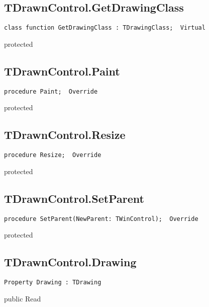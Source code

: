 \subsection{TDrawnControl.GetDrawingClass}
\label{hmi:drawncontrol:tdrawncontrol:getdrawingclass}
\begin{FPCList}
\Declaration 

\begin{verbatim}
class function GetDrawingClass : TDrawingClass;  Virtual
\end{verbatim}
\Visibility
protected
\end{FPCList}
\subsection{TDrawnControl.Paint}
\label{hmi:drawncontrol:tdrawncontrol:paint}
\begin{FPCList}
\Declaration 

\begin{verbatim}
procedure Paint;  Override
\end{verbatim}
\Visibility
protected
\end{FPCList}
\subsection{TDrawnControl.Resize}
\label{hmi:drawncontrol:tdrawncontrol:resize}
\begin{FPCList}
\Declaration 

\begin{verbatim}
procedure Resize;  Override
\end{verbatim}
\Visibility
protected
\end{FPCList}
\subsection{TDrawnControl.SetParent}
\label{hmi:drawncontrol:tdrawncontrol:setparent}
\begin{FPCList}
\Declaration 

\begin{verbatim}
procedure SetParent(NewParent: TWinControl);  Override
\end{verbatim}
\Visibility
protected
\end{FPCList}
\subsection{TDrawnControl.Drawing}
\label{hmi:drawncontrol:tdrawncontrol:drawing}
\begin{FPCList}
\Declaration 

\begin{verbatim}
Property Drawing : TDrawing
\end{verbatim}
\Visibility
public
\Access
Read
\end{FPCList}
